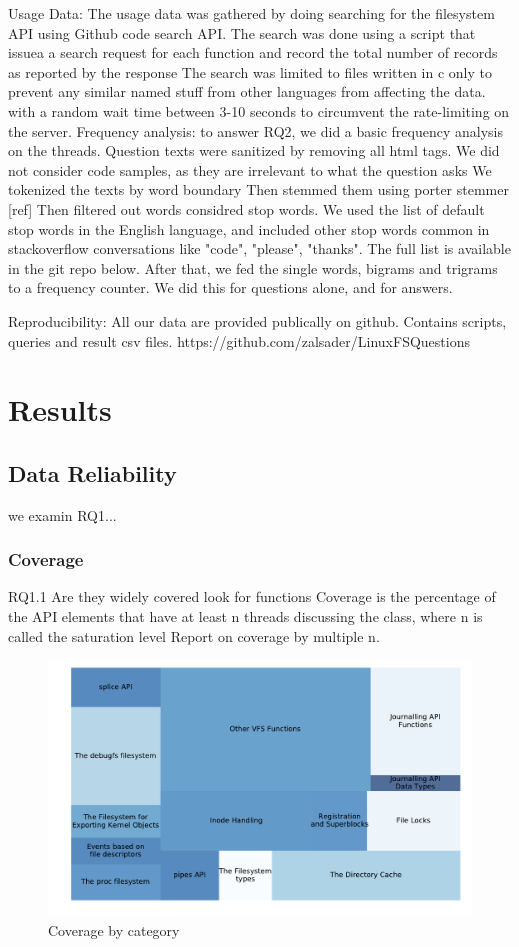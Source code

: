 Usage Data: The usage data was gathered by doing searching for the filesystem API using Github code search API. The search was done using a script that issuea a search request for each function and record the total number of records as reported by the response The search was limited to files written in c only to prevent any similar named stuff from other languages from affecting the data.
with a random wait time between 3-10 seconds to circumvent the rate-limiting on the server.
Frequency analysis: to answer RQ2, we did a basic frequency analysis on the threads.
Question texts were sanitized by removing all html tags.
We did not consider code samples, as they are irrelevant to what the question asks
We tokenized the texts by word boundary
Then stemmed them using porter stemmer [ref]
Then filtered out words considred stop words. We used the list of default stop words in the English language, and included other stop words common in stackoverflow conversations like "code", "please", "thanks". The full list is available in the git repo below.
After that, we fed the single words, bigrams and trigrams to a frequency counter.
We did this for questions alone, and for answers.

Reproducibility:
All our data are provided publically on github. Contains scripts, queries and result csv files.
https://github.com/zalsader/LinuxFSQuestions

\section{Results}
\subsection{Data Reliability}
we examin RQ1...
\subsubsection{Coverage}
RQ1.1
Are they widely covered
look for functions
Coverage is the percentage of the API elements that have at least n threads discussing
the class, where n is called the saturation level
Report on coverage by multiple n. %
\begin{figure}
  \includegraphics{scripts/figures/1-1-coveragebycategory.pdf}
  \caption{Coverage by category}
  \label{fig:covbycategory}
\end{figure}


